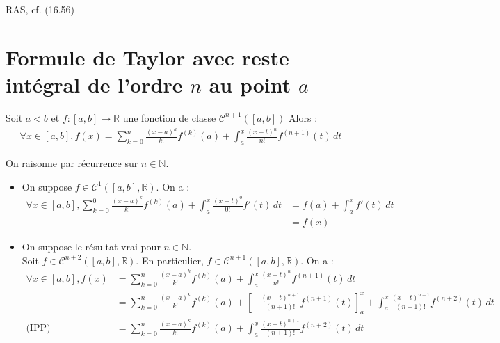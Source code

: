\documentclass[../main.tex]{subfiles}
\begin{document}
\noindent RAS, cf. (16.56)

\section{Formule de Taylor avec reste intégral de l'ordre $n$ au point $a$}
\begin{tcolorbox}[title=Théorème 25.20, title filled=false, colframe=orange, colback=orange!10!white]
    Soit $a < b$ et $f:[a, b] \to \mathbb{R}$ une fonction de classe $\mathcal{C}^{n+1}([a, b])$ Alors : 
    \begin{align*}
        \forall x\in [a, b], f(x) = \sum_{k=0}^{n} \frac{(x-a)^k}{k!} f^{(k)}(a) + \int_{a}^{x} \frac{(x-t)^n}{n!} f^{(n+1)}(t) \, dt
    \end{align*}
\end{tcolorbox}

\noindent On raisonne par récurrence sur $n\in \mathbb{N}$. \\
\begin{itemize}
    \item On suppose $f\in \mathcal{C}^1([a, b], \mathbb{R})$. On a :
    \begin{align*}
        \forall x \in [a, b], \sum_{k=0}^{0} \frac{(x-a)^k}{k!} f^{(k)}(a) + \int_{a}^{x} \frac{(x-t)^0}{0!} f'(t) \, dt &= f(a) + \int_{a}^{x} f'(t) \, dt \\
        &= f(x)
    \end{align*}

    \item On suppose le résultat vrai pour $n\in \mathbb{N}$. \\
    Soit $f\in \mathcal{C}^{n+2}([a, b], \mathbb{R})$. En particulier, $f\in \mathcal{C}^{n+1}([a, b], \mathbb{R})$. On a :
    \begin{align*}
        \forall x\in [a, b], f(x) &= \sum_{k=0}^{n} \frac{(x-a)^k}{k!} f^{(k)}(a) + \int_{a}^{x} \frac{(x-t)^n}{n!} f^{(n+1)}(t) \, dt \\
        &= \sum_{k=0}^{n} \frac{(x-a)^k}{k!} f^{(k)}(a) + \left[ -\frac{(x-t)^{n+1}}{(n+1)!} f^{(n+1)}(t) \right]_a^x + \int_{a}^{x} \frac{(x-t)^{n+1}}{(n+1)!} f^{(n+2)}(t) \, dt \\
        \text{(IPP) } &= \sum_{k=0}^{n} \frac{(x-a)^k}{k!} f^{(k)}(a) + \int_{a}^{x} \frac{(x-t)^{n+1}}{(n+1)!} f^{(n+2)}(t) \, dt
    \end{align*}
\end{itemize}

\end{document}
